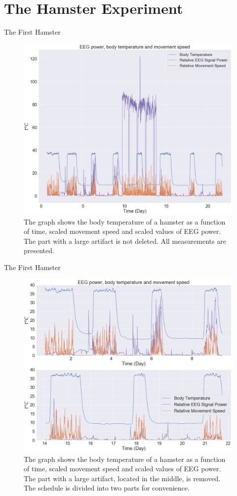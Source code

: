 \documentclass[10pt]{beamer}
\begin{document}
\section{The Hamster Experiment}

\begin{frame}[fragile]{The First Hamster}
\begin{figure}[H]
\centering
\includegraphics[width=0.7\linewidth]{exp1_1.png}
\caption{The graph shows the body temperature of a hamster as a function of time, scaled movement speed and scaled values of EEG power. The part with a large artifact is not deleted. All measurements are presented.}\label{fig:lactate_receptors}
\end{figure}
\end{frame}

\begin{frame}[fragile]{The First Hamster}
\begin{figure}[H]
\centering
\includegraphics[width=0.7\linewidth]{exp1_2.png}
\caption{The graph shows the body temperature of a hamster as a function of time, scaled movement speed and scaled values of EEG power. The part with a large artifact, located in the middle, is removed. The schedule is divided into two parts for convenience.}\label{fig:lactate_receptors}
\end{figure}
\end{frame}
\end{document}
